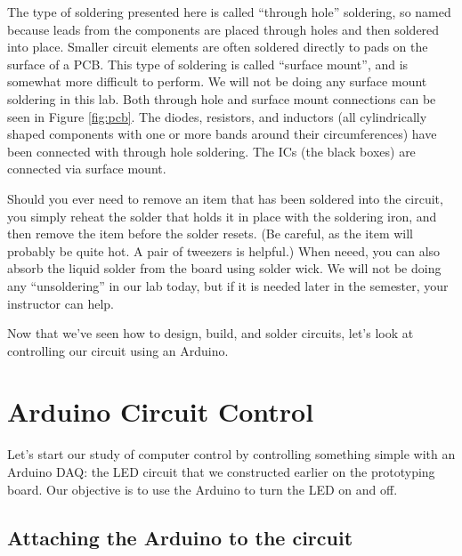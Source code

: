 The type of soldering presented here is called ``through hole'' soldering, so 
named because leads from the components are placed through holes and then
soldered into place. Smaller circuit elements are often soldered directly to
pads on the surface of a PCB. This type of soldering is called ``surface
mount'', and is somewhat more difficult to perform. We will not be doing any
surface mount soldering in this lab. Both through hole and surface mount
connections can be seen in Figure \ref{fig:pcb}. The diodes, resistors, and
inductors (all cylindrically shaped components with one or more bands around 
their circumferences) have been connected with through hole soldering. The
ICs (the black boxes) are connected via surface mount.

Should you ever need to remove an item that has been soldered into the circuit,
you simply reheat the solder that holds it in place with the soldering iron,
and then remove the item before the solder resets. (Be careful, as the item will
probably be quite hot. A pair of tweezers is helpful.) When neeed, you can also
absorb the liquid solder from the board using solder wick. We will not be doing
any ``unsoldering'' in our lab today, but if it is needed later in the 
semester, your instructor can help.


Now that we've seen how to design, build, and solder circuits, let's look at
controlling our circuit using an Arduino.


\section{Arduino Circuit Control}

Let's start our study of computer control by controlling something simple
with an Arduino DAQ: the LED circuit that we constructed earlier on the
prototyping board. Our objective is to use the Arduino to turn the LED on and 
off. 

\subsection{Attaching the Arduino to the circuit}


